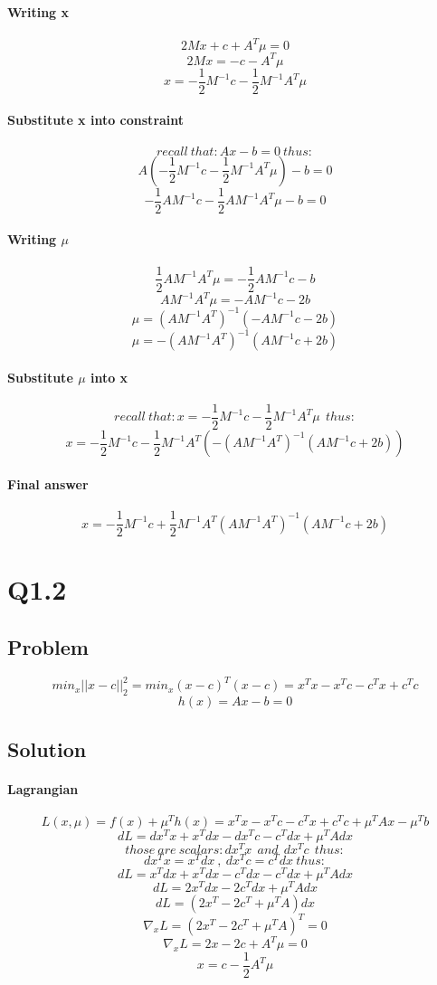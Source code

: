 \documentclass[12pt]{article}
\begin{document}
\paragraph{Writing x}
\[2Mx + c + A^T \mu = 0 \]
\[2Mx = - c - A^T \mu\]
\[x = - \frac{1}{2} M^{-1}c - \frac{1}{2} M^{-1}A^T \mu\]
\paragraph{Substitute x into constraint}
\[recall\  that: Ax - b = 0\ thus:\]
\[A(- \frac{1}{2} M^{-1}c - \frac{1}{2} M^{-1}A^T \mu) - b = 0 \]
\[- \frac{1}{2} AM^{-1}c - \frac{1}{2} AM^{-1}A^T \mu - b = 0 \]
\paragraph{Writing $\mu$}
\[\frac{1}{2} AM^{-1}A^T \mu = - \frac{1}{2} AM^{-1}c - b \]
\[AM^{-1}A^T \mu = - AM^{-1}c - 2b \]
\[ \mu = (AM^{-1}A^T)^{-1}(- AM^{-1}c - 2b)\]
\[ \mu = -(AM^{-1}A^T)^{-1}(AM^{-1}c + 2b)\]
\paragraph{Substitute $\mu$ into x}
\[recall\  that: x = - \frac{1}{2} M^{-1}c - \frac{1}{2} M^{-1}A^T \mu \ \ thus:\]
\[x = - \frac{1}{2} M^{-1}c - \frac{1}{2} M^{-1}A^T (-(AM^{-1}A^T)^{-1}(AM^{-1}c + 2b))\]
\paragraph{Final answer}
\[x = - \frac{1}{2} M^{-1}c + \frac{1}{2} M^{-1}A^T (AM^{-1}A^T)^{-1}(AM^{-1}c + 2b)\]

\newpage
\section{Q1.2}
\subsection{Problem}
\[min_x ||x-c||_2 ^2 = min_x (x-c)^T (x-c) = x^T x - x^T c - c^T x + c^T c\]
\[h(x)= Ax -b = 0 \]
\subsection{Solution}
\paragraph{Lagrangian}
\[L(x,\mu)=f(x) + \mu ^T h(x) = x^T x - x^T c - c^T x + c^T c + \mu ^T Ax - \mu ^T b\]
\[dL = dx^T x + x^T dx - dx^T c - c^T dx + \mu ^T Adx \]
\[those \ are \ scalars: dx^T x \ \ and \ \ dx^T c \ \ thus: \]
\[dx^T x = x^T dx \ , \ dx^T c = c^T dx \ thus: \]
\[dL = x^T dx + x^T dx - c^T dx - c^T dx + \mu ^T Adx \]
\[dL = 2x^T dx - 2c^T dx + \mu ^T Adx \]
\[dL = (2x^T - 2c^T + \mu ^T A)dx \]
\[\nabla_x L = (2x^T - 2c^T + \mu ^T A)^T = 0 \]
\[\nabla_x L = 2x - 2c + A^T \mu = 0 \]
\[x= c - \frac{1}{2} A^T \mu \]
\end{document}
